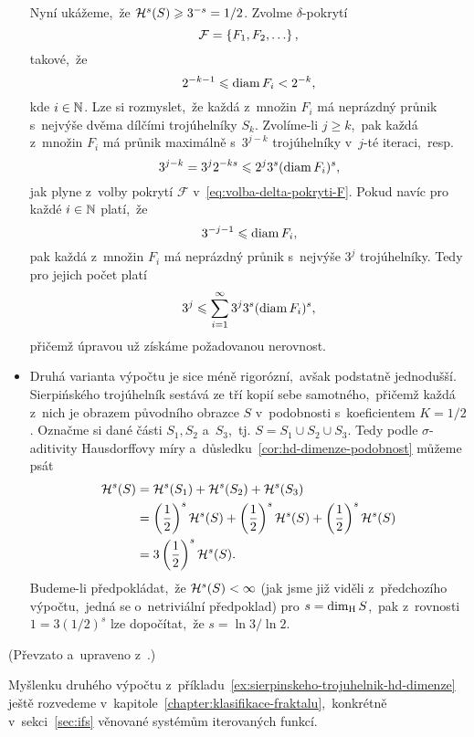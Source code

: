 \begin{example}
\begin{itemize}
        Nyní ukážeme,~že $\mathcal{H}^{s}(S)\geqslant 3^{-s}=1/2$. Zvolme $\delta$-pokrytí
        \[\mathcal{F}=\left\{F_1,F_2,\ldots\right\},\]
        takové,~že
        \begin{equation}\label{eq:volba-delta-pokryti-F}
            2^{-k-1}\leqslant\operatorname{diam}{F_i}<2^{-k},
        \end{equation}
        kde $i\in\mathbb{N}$. Lze si rozmyslet,~že každá z~množin $F_i$ má neprázdný průnik s~nejvýše dvěma dílčími trojúhelníky $S_k$. Zvolíme-li $j\geqslant k$,~pak každá z~množin $F_i$ má průnik maximálně s~$3^{j-k}$ trojúhelníky v~$j$-té iteraci,~resp.
        \[3^{j-k}=3^j2^{-ks}\leqslant2^j3^s(\operatorname{diam}{F_i})^s,\]
        jak plyne z~volby pokrytí $\mathcal{F}$ v~\eqref{eq:volba-delta-pokryti-F}. Pokud navíc pro každé $i\in\mathbb{N}$ platí,~že
        \[3^{-j-1}\leqslant\operatorname{diam}{F_i},\]
        pak každá z~množin $F_i$ má neprázdný průnik s~nejvýše $3^j$ trojúhelníky. Tedy pro jejich počet platí
        \[3^j\leqslant\sum_{i=1}^{\infty}3^j3^s(\operatorname{diam}{F_i})^s,\]
        přičemž úpravou už získáme požadovanou nerovnost.
        \item Druhá varianta výpočtu je sice méně rigorózní,~avšak podstatně jednodušší. Sierpińského trojúhelník sestává ze tří kopií sebe samotného,~přičemž každá z~nich je obrazem původního obrazce $S$ v~podobnosti s~koeficientem $K=1/2$. Označme si dané části $S_1,S_2$ a~$S_3$,~tj. $S=S_1\cup S_2\cup S_3$. Tedy podle $\sigma$-aditivity Hausdorffovy míry a~důsledku~\ref{cor:hd-dimenze-podobnost} můžeme psát
        \begin{align*}
            \mathcal{H}^{s}(S)&=\mathcal{H}^{s}(S_1)+\mathcal{H}^{s}(S_2)+\mathcal{H}^{s}(S_3)\\
            &=\left(\dfrac{1}{2}\right)^s\mathcal{H}^{s}(S)+\left(\dfrac{1}{2}\right)^s\mathcal{H}^{s}(S)+\left(\dfrac{1}{2}\right)^s\mathcal{H}^{s}(S)\\
            &=3\left(\dfrac{1}{2}\right)^s\mathcal{H}^{s}(S).
        \end{align*}
        Budeme-li předpokládat,~že $\mathcal{H}^{s}(S)<\infty$ (jak jsme již viděli z~předchozího výpočtu,~jedná se o~netriviální předpoklad) pro $s=\operatorname{dim_H}{S}$,~pak z~rovnosti $1=3(1/2)^s$ lze dopočítat,~že $s=\ln{3}/\ln{2}$.
    \end{itemize}
\end{example}
(Převzato a~upraveno z~\citep[str. 53]{Falconer2014}.)

Myšlenku druhého výpočtu z~příkladu~\ref{ex:sierpinskeho-trojuhelnik-hd-dimenze} ještě rozvedeme v~kapitole~\ref{chapter:klasifikace-fraktalu},~konkrétně v~sekci~\ref{sec:ifs} věnované systémům iterovaných funkcí.

